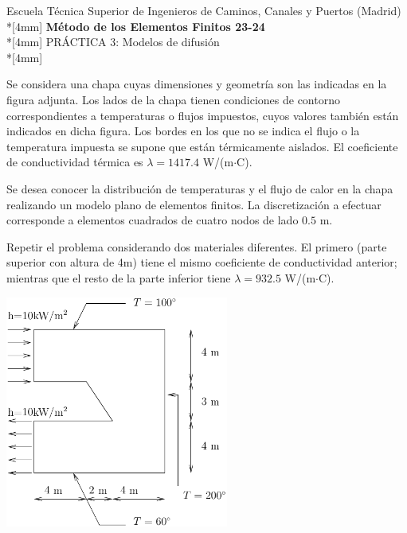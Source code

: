 \documentclass[a4paper,12pt]{article}
\begin{document}
\mbox{}\vspace*{-45mm}

{\centering
{\small\sc Escuela Técnica Superior de Ingenieros de Caminos, Canales y
Puertos (Madrid)}\\*[4mm]
{\Large\bf Método de los Elementos Finitos 23-24}\\*[4mm]
PRÁCTICA 3: Modelos de difusión \\*[4mm]
}

\vspace{3mm}


Se considera una chapa cuyas dimensiones y geometría son las indicadas
en la figura adjunta. Los lados de la chapa tienen condiciones de contorno 
correspondientes a temperaturas o flujos impuestos, cuyos valores
también están indicados en dicha figura. Los bordes en los que no se indica
el flujo o la temperatura impuesta se supone que están térmicamente aislados.
El coeficiente de conductividad térmica es $\lambda=1417.4$ W/(m$\cdot$C).

Se desea conocer la distribución de temperaturas y el flujo de calor en la
chapa realizando un modelo plano de elementos finitos. La discretización a efectuar corresponde a elementos cuadrados de cuatro
nodos de lado $0.5$ m.

Repetir el problema considerando dos materiales diferentes. El primero (parte superior con altura de 4m) tiene el mismo coeficiente de conductividad anterior; mientras que el resto de la parte inferior tiene $\lambda=932.5$ W/(m$\cdot$C). 

\vspace{3mm}


\begin{center}
\includegraphics[width=0.55\textwidth]{practi4.pdf}
\end{center}
\end{document}
